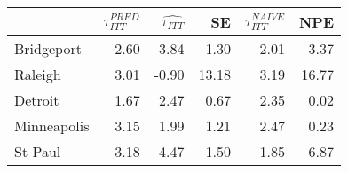 
\begin{tabular}{lrrrrr}
\toprule
  & $\tau_{ITT}^{PRED}$ & $\hat{\tau_{ITT}}$ & SE & $\tau_{ITT}^{NAIVE}$ & NPE\\
\midrule
Bridgeport & 2.60 & 3.84 & 1.30 & 2.01 & 3.37\\
Raleigh & 3.01 & -0.90 & 13.18 & 3.19 & 16.77\\
Detroit & 1.67 & 2.47 & 0.67 & 2.35 & 0.02\\
Minneapolis & 3.15 & 1.99 & 1.21 & 2.47 & 0.23\\
St Paul & 3.18 & 4.47 & 1.50 & 1.85 & 6.87\\
\bottomrule
\end{tabular}